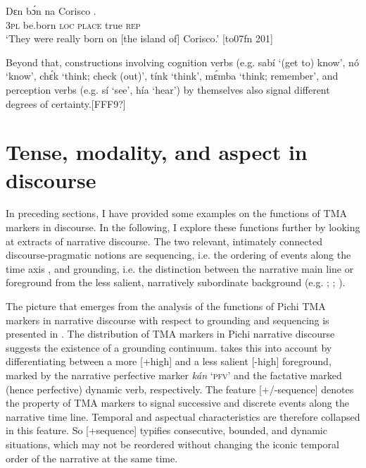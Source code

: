 \ea%
    \label{ex:key:455}
    \gll Dɛn  bɔ́n    na  Corisco   .\\
\textsc{3pl}  be.born  \textsc{loc}  \textsc{place}  true  \textsc{rep}\\

\glt ‘They were really born on [the island of] Corisco.’ [to07fn 201]
\z

Beyond that, constructions involving cognition verbs (e.g. sabí ‘(get to) know’, nó ‘know’, chɛ́k ‘think; check (out)’, tínk ‘think’, mɛ́mba ‘think; remember’, and perception verbs (e.g. sí ‘see’, hía ‘hear’) by themselves also signal different degrees of certainty.[FFF9?] 

\section{Tense, modality, and aspect in discourse}\label{sec:6.8}

In preceding sections, I have provided some examples on the functions of TMA markers in discourse. In the following, I explore these functions further by looking at extracts of narrative discourse. The two relevant, intimately connected discourse-pragmatic notions are sequencing, i.e. the ordering of events along the time axis \citep{Hopper1982}, and grounding, i.e. the distinction between the narrative main line or foreground from the less salient, narratively subordinate background (e.g. \citealt{HopperThompson1980}; \citealt{Longacre1996}; \citealt{YoussefJames1999}).


The picture that emerges from the analysis of the functions of Pichi TMA markers in narrative discourse with respect to grounding and sequencing is presented in . The distribution of TMA markers in Pichi narrative discourse suggests the existence of a grounding continuum.  takes this into account by differentiating between a more [+high] and a less salient [-high] foreground, marked by the narrative perfective marker \textit{kán} ‘\textsc{pfv}’ and the factative marked (hence perfective) dynamic verb, respectively. The feature [+/-sequence] denotes the property of TMA markers to signal successive and discrete events along the narrative time line. Temporal and aspectual characteristics are therefore collapsed in this feature. So [+sequence] typifies consecutive, bounded, and dynamic situations, which may not be reordered without changing the iconic temporal order of the narrative at the same time. 



